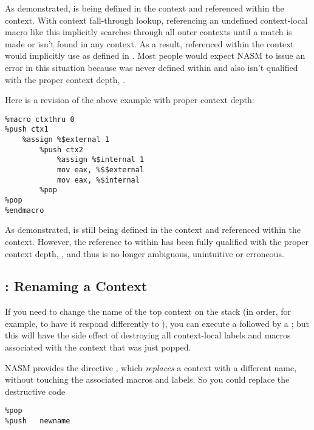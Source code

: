 As demonstrated,  is being defined in the 
context and referenced within the  context. With context
fall-through lookup, referencing an undefined context-local macro
like this implicitly searches through all outer contexts until a match
is made or isn't found in any context. As a result, 
referenced within the  context would implicitly use 
as defined in . Most people would expect NASM to issue an error in
this situation because  was never defined within 
and also isn't qualified with the proper context depth, .

Here is a revision of the above example with proper context depth:

\begin{lstlisting}
%macro ctxthru 0
%push ctx1
    %assign %$external 1
        %push ctx2
            %assign %$internal 1
            mov eax, %$$external
            mov eax, %$internal
        %pop
%pop
%endmacro
\end{lstlisting}

As demonstrated,  is still being defined in the 
context and referenced within the  context. However, the
reference to  within  has been fully qualified with
the proper context depth, , and thus is no longer ambiguous,
unintuitive or erroneous.

\subsection{: Renaming a Context}
\label{subsec:ctxrepl}

If you need to change the name of the top context on the stack (in
order, for example, to have it respond differently to ),
you can execute a  followed by a ; but this will
have the side effect of destroying all context-local labels and
macros associated with the context that was just popped.

NASM provides the directive , which \emph{replaces} a context
with a different name, without touching the associated macros and
labels. So you could replace the destructive code

\begin{lstlisting}
%pop
%push   newname
\end{lstlisting}

